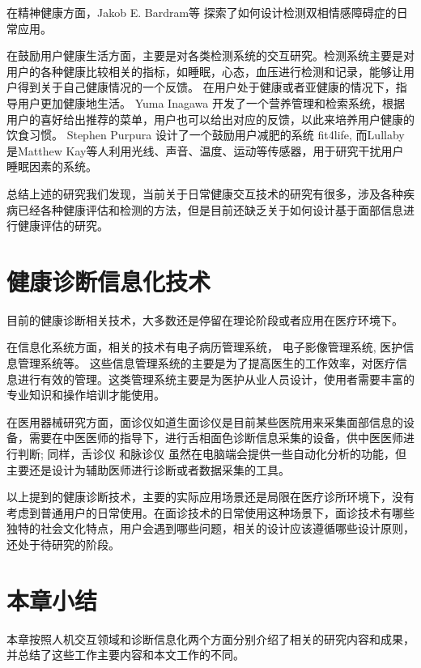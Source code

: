 在精神健康方面，Jakob E. Bardram等 \cite{bardram2013designing}探索了如何设计检测双相情感障碍症的日常应用。

在鼓励用户健康生活方面，主要是对各类检测系统的交互研究。检测系统主要是对用户的各种健康比较相关的指标，如睡眠，心态，血压进行检测和记录，能够让用户得到关于自己健康情况的一个反馈。
在用户处于健康或者亚健康的情况下，指导用户更加健康地生活。 
Yuma Inagawa  \cite{Inagawa2013A} 开发了一个营养管理和检索系统，根据用户的喜好给出推荐的菜单，用户也可以给出对应的反馈，以此来培养用户健康的饮食习惯。
Stephen Purpura \cite{purpura2011fit4life} 设计了一个鼓励用户减肥的系统 fit4life,  而Lullaby  \cite{kay2012lullaby} 是Matthew Kay等人利用光线、声音、温度、运动等传感器，用于研究干扰用户睡眠因素的系统。

总结上述的研究我们发现，当前关于日常健康交互技术的研究有很多，涉及各种疾病已经各种健康评估和检测的方法，但是目前还缺乏关于如何设计基于面部信息进行健康评估的研究。

\section{健康诊断信息化技术}

目前的健康诊断相关技术，大多数还是停留在理论阶段或者应用在医疗环境下。

在信息化系统方面，相关的技术有电子病历管理系统\cite{高春芳2013电子病历系统应用现状及前景展望}， 电子影像管理系统\cite{张安平2018医院信息管理系统的电子病历和医学影像系统分析}, 医护信息管理系统\cite{虞正红2018医护合作静脉血栓栓塞管理信息化平台的设计与应用}等。
这些信息管理系统的主要是为了提高医生的工作效率，对医疗信息进行有效的管理。这类管理系统主要是为医护从业人员设计，使用者需要丰富的专业知识和操作培训才能使用。

在医用器械研究方面，面诊仪如道生面诊仪\cite{邸丹2016手持式舌象仪的研制}是目前某些医院用来采集面部信息的设备，需要在中医医师的指导下，进行舌相面色诊断信息采集的设备，供中医医师进行判断;
 同样，舌诊仪\cite{李丹溪2017舌诊仪的发展及其在舌诊客观化研究中的应用现状} 和脉诊仪 \cite{牛婷婷2017脉诊仪}虽然在电脑端会提供一些自动化分析的功能，但主要还是设计为辅助医师进行诊断或者数据采集的工具。
 

以上提到的健康诊断技术，主要的实际应用场景还是局限在医疗诊所环境下，没有考虑到普通用户的日常使用。在面诊技术的日常使用这种场景下，面诊技术有哪些独特的社会文化特点，用户会遇到哪些问题，相关的设计应该遵循哪些设计原则，还处于待研究的阶段。

\section{本章小结}
本章按照人机交互领域和诊断信息化两个方面分别介绍了相关的研究内容和成果，并总结了这些工作主要内容和本文工作的不同。

